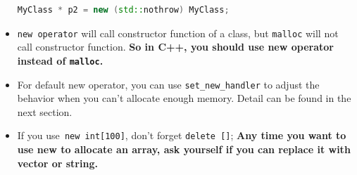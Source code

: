 \documentclass[a4paper,11pt,twoside]{book}
\begin{document}
\begin{itemize}
\begin{lstlisting}[frame=single, language=c++]
MyClass * p2 = new (std::nothrow) MyClass; 
\end{lstlisting}


	\item \texttt{new operator} will call constructor function of a class, but \texttt{malloc} will not call constructor function.  \textbf{So in C++, you should use new operator instead of \texttt{malloc}.}
	
	\item For default new operator, you can use \texttt{set\_new\_handler} to adjust the behavior when you can't allocate enough memory. Detail can be found in the next section.
	
	
	\item If you use\texttt{ new int[100]}, don't forget \texttt{delete []};  \textbf{Any time you want to use new to allocate an array, ask yourself if you can replace it with vector or string.}
\end{itemize}
\end{document}
